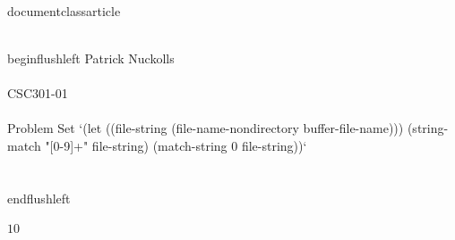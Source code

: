 \\documentclass{article}
\begin{document}
\\begin{flushleft}
	Patrick Nuckolls \\\\
	CSC301-01 \\\\
	Problem Set `(let ((file-string (file-name-nondirectory buffer-file-name))) (string-match "[0-9]+" file-string) (match-string 0 file-string))` \\\\
\\end{flushleft}

$1$0

\
\end{document}
